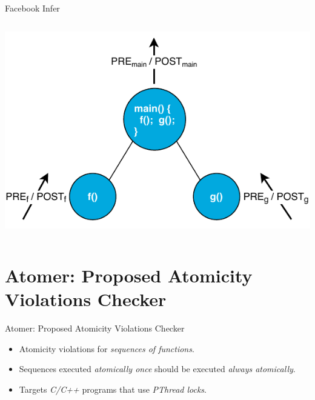 \documentclass[10pt, hyperref={unicode}, aspectratio=169]{beamer}
\begin{document}
\begin{frame}{Facebook Infer}
\begin{columns}
        \begin{column}{.45 \linewidth}
            \begin{center}
                \includegraphics[width=1 \linewidth]{img/infer.pdf}
            \end{center}
        \end{column}
    \end{columns}
\end{frame}


\section{Atomer: Proposed Atomicity Violations Checker}
\begin{frame}{Atomer: Proposed Atomicity Violations Checker}
    \begin{itemize}\setlength\itemsep{3em}
        \item
            \alert{Atomicity violations} for \emph{sequences of
            functions}.

        \item
            Sequences executed \emph{atomically once} should be
            executed \emph{always atomically}.

        \item
            Targets \emph{C/C++} programs that use \emph{PThread locks}.
    \end{itemize}
\end{frame}
\end{document}
